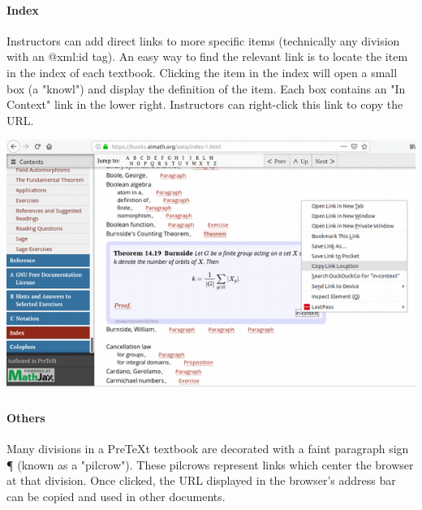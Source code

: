 \documentclass[10pt,]{article}
\begin{document}
\paragraph[{Index}]{Index}\hypertarget{paragraphs-2}{}
\begin{sidebyside}{2}{0.01}{0.01}{0.02}
\begin{sbspanel}{0.48}
\hypertarget{p-8}{}%
Instructors can add direct links to more specific items (technically any division with an @xml:id tag). An easy way to find the relevant link is to locate the item in the index of each textbook. Clicking the item in the index will open a small box (a "knowl") and display the definition of the item. Each box contains an "In Context" link in the lower right. Instructors can right-click this link to copy the URL.%
\end{sbspanel}
\begin{sbspanel}{0.48}
\includegraphics[width=1\linewidth]{images/knowl-URL.png}
\end{sbspanel}
\begin{sbscaption}{0.48}
\end{sbscaption}
\begin{sbscaption}{0.48}
\end{sbscaption}
\end{sidebyside}
\typeout{************************************************}
\typeout{************************************************}
\paragraph[{Others}]{Others}\hypertarget{paragraphs-3}{}
\hypertarget{p-9}{}%
Many divisions in a PreTeXt textbook are decorated with a faint paragraph sign ¶ (known as a "pilcrow"). These pilcrows represent links which center the browser at that division. Once clicked, the URL displayed in the browser's address bar can be copied and used in other documents.%
\typeout{************************************************}
\typeout{************************************************}
\end{document}

